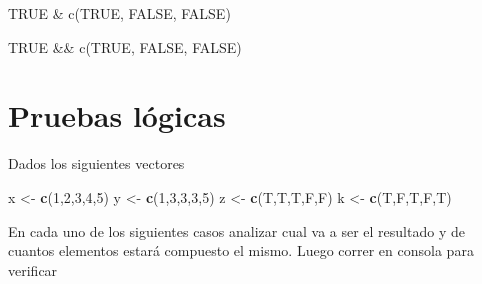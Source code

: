 \documentclass[]{book}
\newenvironment{Shaded}{\begin{snugshade}}{\end{snugshade}}
\newcommand{\DecValTok}[1]{\textcolor[rgb]{0.00,0.00,0.81}{#1}}
\newcommand{\KeywordTok}[1]{\textcolor[rgb]{0.13,0.29,0.53}{\textbf{#1}}}
\newcommand{\NormalTok}[1]{#1}
\newcommand{\StringTok}[1]{\textcolor[rgb]{0.31,0.60,0.02}{#1}}
\begin{document}
TRUE \& c(TRUE, FALSE, FALSE)

TRUE \&\& c(TRUE, FALSE, FALSE)

\hypertarget{pruebas-luxf3gicas}{%
\section{Pruebas lógicas}\label{pruebas-luxf3gicas}}

Dados los siguientes vectores

\begin{Shaded}
\begin{Highlighting}[]
\NormalTok{x <-}\StringTok{ }\KeywordTok{c}\NormalTok{(}\DecValTok{1}\NormalTok{,}\DecValTok{2}\NormalTok{,}\DecValTok{3}\NormalTok{,}\DecValTok{4}\NormalTok{,}\DecValTok{5}\NormalTok{)}
\NormalTok{y <-}\StringTok{ }\KeywordTok{c}\NormalTok{(}\DecValTok{1}\NormalTok{,}\DecValTok{3}\NormalTok{,}\DecValTok{3}\NormalTok{,}\DecValTok{3}\NormalTok{,}\DecValTok{5}\NormalTok{)}
\NormalTok{z <-}\StringTok{ }\KeywordTok{c}\NormalTok{(T,T,T,F,F)}
\NormalTok{k <-}\StringTok{ }\KeywordTok{c}\NormalTok{(T,F,T,F,T)}
\end{Highlighting}
\end{Shaded}

En cada uno de los siguientes casos analizar cual va a ser el resultado y de cuantos elementos estará compuesto el mismo. Luego correr en consola para verificar
\end{document}
